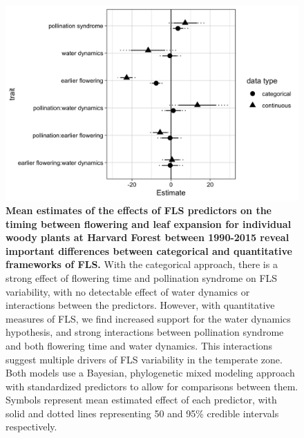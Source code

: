 \documentclass{article}
\begin{document}
 \begin{figure}[h!]
        \centering
          \includegraphics[width=\textwidth]{..//HF.jpeg}
          \caption{\textbf{Mean estimates of the effects of FLS predictors on the timing between flowering and leaf expansion for individual woody plants at Harvard Forest between 1990-2015 reveal important differences between categorical and quantitative frameworks of FLS.}  With the categorical approach, there is a strong effect of flowering time and pollination syndrome on FLS variability, with no detectable effect of water dynamics or interactions between the predictors. However, with quantitative measures of FLS, we find increased support for the water dynamics hypothesis, and strong interactions between pollination syndrome and both flowering time and water dynamics. This interactions suggest multiple drivers of FLS variability in the temperate zone.  Both models use a Bayesian, phylogenetic mixed modeling approach with standardized predictors to allow for comparisons between them. Symbols represent mean estimated effect of each predictor, with solid and dotted lines representing 50 and 95\% credible intervals respectively.}  
        \label{fig:muplots.HF}
    \end{figure}    

    
\end{document}
